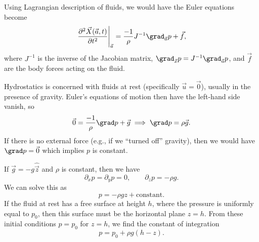 \begin{node}
\begin{node}\label{fluids:euler-flow-0006}%
Using Lagrangian description of fluids, we would have the Euler
equations become
\begin{equation}
\left.\frac{\partial^{2}\vec{X}(\vec{a},t)}{\partial t^{2}}\right|_{\vec{a}}
=\frac{-1}{\rho}J^{-1}\grad_{\vec{a}}p+\vec{f},
\end{equation}
where $J^{-1}$ is the inverse of the Jacobian matrix,
$\grad_{\vec{x}}p=J^{-1}\grad_{\vec{a}}p$, and $\vec{f}$ are the body
forces acting on the fluid.
\end{node} %
\end{node} %

\begin{node}[Hydrostatics]\label{fluids:euler-flow-0007}%
Hydrostatics is concerned with fluids at rest (specifically $\vec{u}=\vec{0}$),
usually in the presence of gravity. Euler's equations of motion then
have the left-hand side vanish, so
\begin{equation}
\vec{0}=\frac{-1}{\rho}\grad p + \vec{g}\implies\grad p =\rho\vec{g}.
\end{equation}
If there is no external force (e.g., if we ``turned off'' gravity), then
we would have $\grad p=\vec{0}$ which implies $p$ is constant.

If $\vec{g}=-g\widehat{\vec{z}}$ and $\rho$ is constant, then we have
\[\partial_{x}p=\partial_{y}p=0,\qquad\partial_{z}p=-\rho g.\]
We can solve this as
\[p=-\rho gz+\mbox{constant}.\]
If the fluid at rest has a free surface at height $h$, where the
pressure is uniformly equal to $p_{0}$, then this surface must be the
horizontal plane $z=h$. From these initial conditions $p=p_{0}$ for
$z=h$, we find the constant of integration
\begin{equation}\label{eq:fluids:euler-flow:hydrostatic}
p=p_{0}+\rho g(h-z).
\end{equation}



\end{node}

